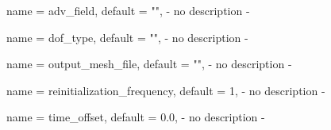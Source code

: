 \begin{parameter}{
    name    = {adv_field},
    default = {""},
}
- no description -
\end{parameter}

\begin{parameter}{
    name    = {dof_type},
    default = {""},
}
- no description -
\end{parameter}

\begin{parameter}{
    name    = {output_mesh_file},
    default = {""},
}
- no description -
\end{parameter}

\begin{parameter}{
    name    = {reinitialization_frequency},
    default = {1},
}
- no description -
\end{parameter}

\begin{parameter}{
    name    = {time_offset},
    default = {0.0},
}
- no description -
\end{parameter}

